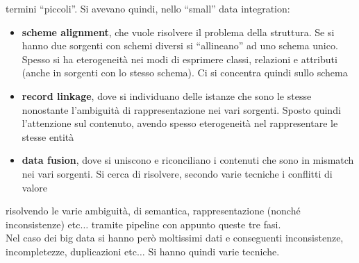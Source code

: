 \documentclass[a4paper,12pt, oneside]{book}
\begin{document}
termini ``piccoli''. Si avevano quindi, nello ``small'' data integration:
\begin{itemize}
  \item \textbf{scheme alignment}, che vuole risolvere il problema della
  struttura. Se si hanno due sorgenti con schemi diversi si ``allineano'' ad uno
  schema unico. Spesso si ha eterogeneità nei modi di esprimere classi,
  relazioni e attributi (anche in sorgenti con lo stesso schema). Ci si
  concentra quindi sullo schema
  \item \textbf{record linkage}, dove si individuano delle istanze che sono le
  stesse nonostante l'ambiguità di rappresentazione nei vari sorgenti. Sposto
  quindi l'attenzione sul contenuto, avendo spesso eterogeneità nel
  rappresentare le stesse entità
  \item \textbf{data fusion}, dove si uniscono e riconciliano i contenuti che
  sono in mismatch nei vari sorgenti. Si cerca di risolvere, secondo varie
  tecniche i conflitti di valore
\end{itemize}
risolvendo le varie ambiguità, di semantica, rappresentazione (nonché
inconsistenze) etc$\ldots$ tramite pipeline con appunto queste tre fasi.\\
Nel caso dei big data si hanno però moltissimi dati e conseguenti inconsistenze,
incompletezze, duplicazioni etc$\ldots$ Si hanno quindi varie tecniche.
\end{document}
